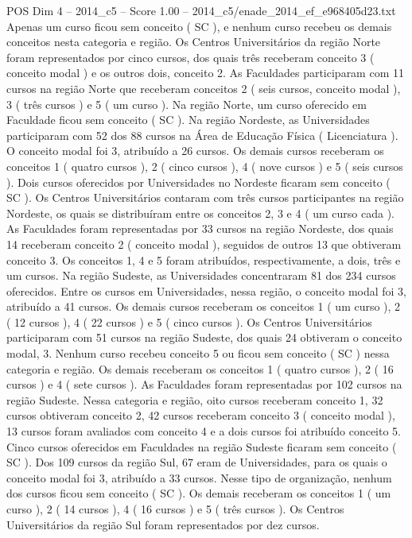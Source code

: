 \begin{textsample}{POS Dim 4 – 2014\_c5 – Score 1.00 – 2014\_c5/enade\_2014\_ef\_e968405d23.txt}
Apenas um curso ficou sem conceito ( SC ), e nenhum curso recebeu os demais conceitos nesta categoria e região.
Os Centros Universitários da região Norte foram representados por cinco cursos, dos quais três receberam conceito 3 ( conceito modal ) e os outros dois, conceito 2.
As Faculdades participaram com 11 cursos na região Norte que receberam conceitos 2 ( seis cursos, conceito modal ), 3 ( três cursos ) e 5 ( um curso ).
Na região Norte, um curso oferecido em Faculdade ficou sem conceito ( SC ).
Na região Nordeste, as Universidades participaram com 52 dos 88 cursos na Área de Educação Física ( Licenciatura ).
O conceito modal foi 3, atribuído a 26 cursos.
Os demais cursos receberam os conceitos 1 ( quatro cursos ), 2 ( cinco cursos ), 4 ( nove cursos ) e 5 ( seis cursos ).
Dois cursos oferecidos por Universidades no Nordeste ficaram sem conceito ( SC ).
Os Centros Universitários contaram com três cursos participantes na região Nordeste, os quais se distribuíram entre os conceitos 2, 3 e 4 ( um curso cada ).
As Faculdades foram representadas por 33 cursos na região Nordeste, dos quais 14 receberam conceito 2 ( conceito modal ), seguidos de outros 13 que obtiveram conceito 3.
Os conceitos 1, 4 e 5 foram atribuídos, respectivamente, a dois, três e um cursos.
Na região Sudeste, as Universidades concentraram 81 dos 234 cursos oferecidos.
Entre os cursos em Universidades, nessa região, o conceito modal foi 3, atribuído a 41 cursos.
Os demais cursos receberam os conceitos 1 ( um curso ), 2 ( 12 cursos ), 4 ( 22 cursos ) e 5 ( cinco cursos ).
Os Centros Universitários participaram com 51 cursos na região Sudeste, dos quais 24 obtiveram o conceito modal, 3.
Nenhum curso recebeu conceito 5 ou ficou sem conceito ( SC ) nessa categoria e região.
Os demais receberam os conceitos 1 ( quatro cursos ), 2 ( 16 cursos ) e 4 ( sete cursos ).
As Faculdades foram representadas por 102 cursos na região Sudeste.
Nessa categoria e região, oito cursos receberam conceito 1, 32 cursos obtiveram conceito 2, 42 cursos receberam conceito 3 ( conceito modal ), 13 cursos foram avaliados com conceito 4 e a dois cursos foi atribuído conceito 5.
Cinco cursos oferecidos em Faculdades na região Sudeste ficaram sem conceito ( SC ).
Dos 109 cursos da região Sul, 67 eram de Universidades, para os quais o conceito modal foi 3, atribuído a 33 cursos.
Nesse tipo de organização, nenhum dos cursos ficou sem conceito ( SC ).
Os demais receberam os conceitos 1 ( um curso ), 2 ( 14 cursos ), 4 ( 16 cursos ) e 5 ( três cursos ).
Os Centros Universitários da região Sul foram representados por dez cursos.

\end{textsample}
